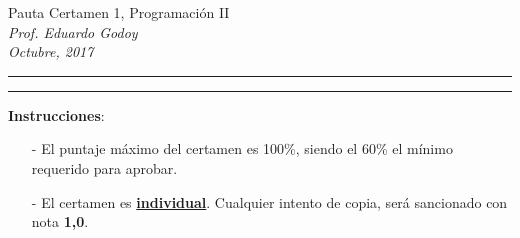 \documentclass[10pt]{article}
\begin{document}
\begin{center}
    {\Large Pauta Certamen 1, Programaci\'on II} \\
    \emph{\small Prof. Eduardo Godoy} \\
    \emph{\scriptsize Octubre, 2017}
\end{center}
\vspace*{-35pt}
\begin{center}
    \rule{1\textwidth}{.3pt}
\end{center}
\vspace*{-42pt}
\begin{center}
    \rule{1\textwidth}{2pt}
\end{center}

\vspace*{-15pt}
{\small \textbf{Instrucciones}:}
\vspace*{-15pt}

{\scriptsize
\begin{itemize}
    \item[-] El puntaje m\'aximo del certamen es 100\%, siendo el 60\% el m\'inimo requerido para aprobar.
    \item[-] El certamen es \underline{\textbf{individual}}. Cualquier intento de copia, ser\'a sancionado con nota \textbf{1,0}.
\end{itemize}
}
\vspace*{10pt}

\vspace*{-30pt}
\end{document}
